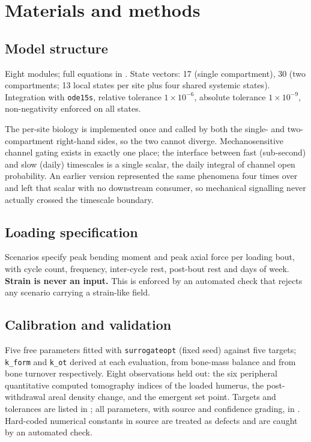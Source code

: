 \documentclass[10pt,letterpaper]{article}
\begin{document}
\section*{Materials and methods}

\subsection*{Model structure}

Eight modules; full equations in . State vectors: 17 (single
compartment), 30 (two compartments; 13 local states per site plus four shared
systemic states). Integration with \texttt{ode15s}, relative tolerance
$1\times10^{-6}$, absolute tolerance $1\times10^{-9}$, non-negativity enforced
on all states.

The per-site biology is implemented once and called by both the single- and
two-compartment right-hand sides, so the two cannot diverge. Mechanosensitive
channel gating exists in exactly one place; the interface between fast
(sub-second) and slow (daily) timescales is a single scalar, the daily
integral of channel open probability. An earlier version represented the same
phenomena four times over and left that scalar with no downstream consumer, so
mechanical signalling never actually crossed the timescale boundary.

\subsection*{Loading specification}

Scenarios specify peak bending moment and peak axial force per loading bout,
with cycle count, frequency, inter-cycle rest, post-bout rest and days of
week. \textbf{Strain is never an input.} This is enforced by an automated
check that rejects any scenario carrying a strain-like field.

\subsection*{Calibration and validation}

Five free parameters fitted with \texttt{surrogateopt} (fixed seed) against five
targets; \texttt{k\_form} and \texttt{k\_ot} derived at each evaluation, from
bone-mass balance and from bone turnover respectively. Eight observations held
out: the six peripheral quantitative computed
tomography indices of the loaded humerus, the post-withdrawal areal density
change, and the emergent set point. Targets and tolerances are listed in
; all parameters, with source and confidence grading, in
. Hard-coded numerical constants in source are treated as
defects and are caught by an automated check.
\end{document}
